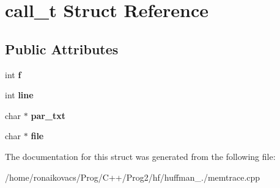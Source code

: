 \hypertarget{structcall__t}{}\section{call\+\_\+t Struct Reference}
\label{structcall__t}
\subsection*{Public Attributes}
\begin{DoxyCompactItemize}
\item 
\mbox{\label{structcall__t_a59d4e803f2e254dc5ceeb9c1bfcc9355}} 
int {\bfseries f}
\item 
\mbox{\label{structcall__t_aaa4f0e556289bbf4da414897b10e0916}} 
int {\bfseries line}
\item 
\mbox{\label{structcall__t_a24e185188a17e272396e118640672aba}} 
char $\ast$ {\bfseries par\+\_\+txt}
\item 
\mbox{\label{structcall__t_a97629ec51d024396221fe7d48c84859a}} 
char $\ast$ {\bfseries file}
\end{DoxyCompactItemize}


The documentation for this struct was generated from the following file\+:\begin{DoxyCompactItemize}
\item 
/home/ronaikovacs/\+Prog/\+C++/\+Prog2/hf/huffman\+\_./memtrace.\+cpp\end{DoxyCompactItemize}
